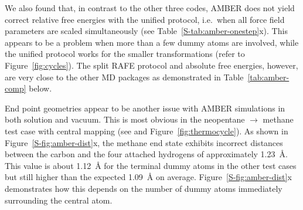 \documentclass[journal=jctcce,manuscript=article]{achemso}
\begin{document}
We also found that, in contrast to the other three codes, AMBER does not yield
correct relative free energies with the unified protocol, i.e.\
when all force field parameters are scaled simultaneously (see
Table~\ref{S-tab:amber-onestep}x).
  This appears to be a problem when more than
a few dummy atoms are involved, while the unified protocol works for the
smaller transformations (refer to Figure~\ref{fig:cycles}).  The split RAFE
protocol and absolute free energies, however, are very close to the other MD
packages as demonstrated in Table~\ref{tab:amber-comp} below.

End point geometries appear to be another issue with AMBER simulations
in both solution and vacuum.  This is most obvious in the neopentane
$\rightarrow$ methane test case with central mapping (see
 and Figure~\ref{fig:thermocycle}).
As shown in Figure~\ref{S-fig:amber-dist}x, the methane end state exhibits
incorrect distances between the carbon and the four
attached hydrogens of approximately \SI{1.23}{\angstrom}.  This value is about
\SI{1.12}{\angstrom} for the terminal dummy atoms in the other test cases but
still higher than the expected \SI{1.09}{\angstrom} on average.
Figure~\ref{S-fig:amber-dist}x demonstrates how this depends on the number of
dummy atoms immediately surrounding the central atom.
\end{document}
